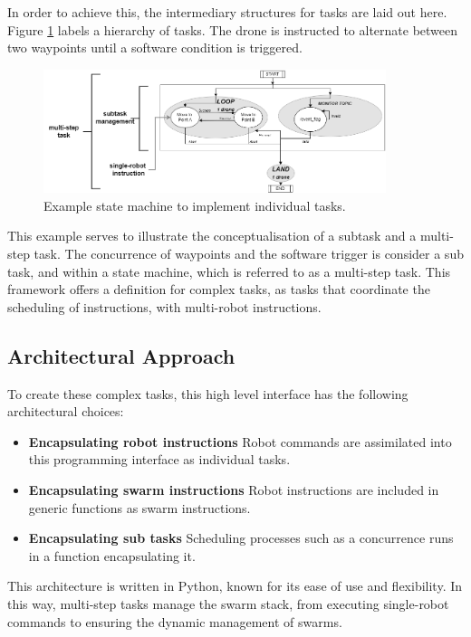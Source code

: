 In order to achieve this, the intermediary structures for tasks are laid out here. Figure \ref{fig:loop} labels a hierarchy of tasks. The drone is instructed to alternate between two waypoints until a software condition is triggered.

\begin{figure}[h]
    \raggedright
    \includegraphics[width=10cm]{images/testbed/SPI/concept_spi_bw.png}
    \caption{Example state machine to implement individual tasks.}
    \label{fig:loop}
\end{figure}

This example serves to illustrate the conceptualisation of a subtask and a multi-step task. The concurrence of waypoints and the software trigger is consider a sub task, and within a state machine, which is referred to as a multi-step task. This framework offers a definition for complex tasks, as tasks that coordinate the scheduling of instructions, with multi-robot instructions.

\subsection{Architectural Approach}

To create these complex tasks, this high level interface has the following architectural choices:

\begin{itemize}
    \item \textbf{Encapsulating robot instructions } Robot commands are assimilated into this programming interface as individual tasks.
    \item \textbf{Encapsulating swarm instructions } Robot instructions are included in generic functions as swarm instructions.
    \item \textbf{Encapsulating sub tasks} Scheduling processes such as a concurrence runs in a function encapsulating it.
\end{itemize}

This architecture is written in Python, known for its ease of use and flexibility. In this way, multi-step tasks manage the swarm stack, from executing single-robot commands to ensuring the dynamic management of swarms. 

